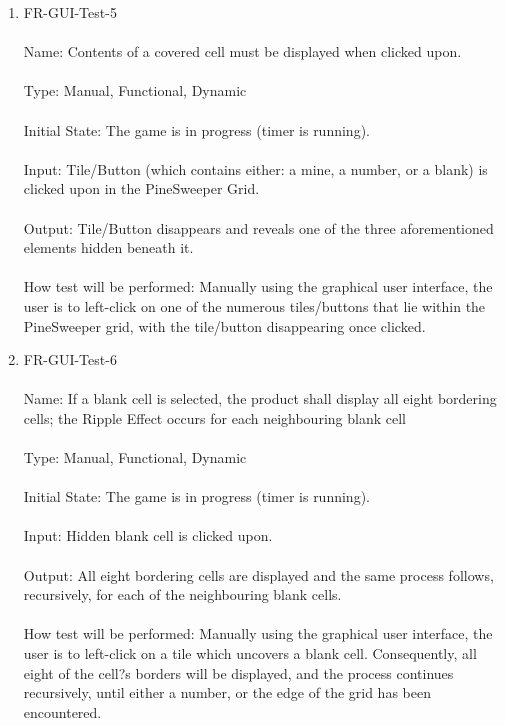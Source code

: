 \documentclass[12pt, titlepage]{article}
\begin{document}
\begin{enumerate}
\item{FR-GUI-Test-5\\\\}
Name: Contents of a covered cell must be displayed when clicked upon.\\\\
Type: Manual, Functional, Dynamic\\\\
Initial State: The game is in progress (timer is running).\\\\
Input: Tile/Button (which contains either: a mine, a number, or a blank) is clicked upon in the PineSweeper Grid.\\\\
Output: Tile/Button disappears and reveals one of the three aforementioned elements hidden beneath it.\\\\
How test will be performed: Manually using the graphical user interface, the user is to left-click on one of the numerous tiles/buttons that lie within the PineSweeper grid, with the tile/button disappearing once clicked.\\

\item{FR-GUI-Test-6\\\\}
Name: If a blank cell is selected, the product shall display all eight bordering cells; the Ripple Effect occurs for each neighbouring blank cell\\\\
Type: Manual, Functional, Dynamic\\\\
Initial State: The game is in progress (timer is running).\\\\
Input: Hidden blank cell is clicked upon.\\\\
Output: All eight bordering cells are displayed and the same process follows, recursively, for each of the neighbouring blank cells.\\\\
How test will be performed: Manually using the graphical user interface, the user is to left-click on a tile which uncovers a blank cell. Consequently, all eight of the cell?s borders will be displayed, and the process continues recursively, until either a number, or the edge of the grid has been encountered.\\


\end{enumerate}
\end{document}
